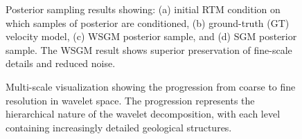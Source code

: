 \documentclass{IMAGE2025}
\begin{document}
\begin{figure}
\begin{minipage}{0.50\linewidth}
\end{minipage}%

\caption{\label{fig-composite}Posterior sampling results showing: (a)
initial RTM condition on which samples of posterior are conditioned, (b)
ground-truth (GT) velocity model, (c) WSGM posterior sample, and (d) SGM
posterior sample. The WSGM result shows superior preservation of
fine-scale details and reduced noise.}

\end{figure}%

\begin{figure}


\caption{\label{fig-multiscale}Multi-scale visualization showing the
progression from coarse to fine resolution in wavelet space. The
progression represents the hierarchical nature of the wavelet
decomposition, with each level containing increasingly detailed
geological structures.}

\end{figure}%
\end{document}
